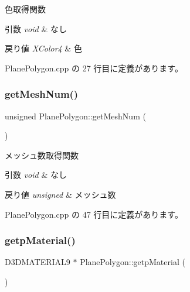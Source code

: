 色取得関数 


\begin{DoxyParams}{引数}
{\em void} & なし \\
\hline
\end{DoxyParams}

\begin{DoxyRetVals}{戻り値}
{\em X\+Color4} & 色 \\
\hline
\end{DoxyRetVals}


 Plane\+Polygon.\+cpp の 27 行目に定義があります。

\mbox{\label{class_plane_polygon_a494068044805bdd4054bc69328c71d7f}} 
\subsubsection{\texorpdfstring{get\+Mesh\+Num()}{getMeshNum()}}
{\footnotesize\ttfamily unsigned Plane\+Polygon\+::get\+Mesh\+Num (\begin{DoxyParamCaption}{ }\end{DoxyParamCaption})}



メッシュ数取得関数 


\begin{DoxyParams}{引数}
{\em void} & なし \\
\hline
\end{DoxyParams}

\begin{DoxyRetVals}{戻り値}
{\em unsigned} & メッシュ数 \\
\hline
\end{DoxyRetVals}


 Plane\+Polygon.\+cpp の 47 行目に定義があります。

\mbox{\label{class_plane_polygon_aa475e66d5cbd2c966d47d97dc253ae24}} 
\subsubsection{\texorpdfstring{getp\+Material()}{getpMaterial()}}
{\footnotesize\ttfamily D3\+D\+M\+A\+T\+E\+R\+I\+A\+L9 $\ast$ Plane\+Polygon\+::getp\+Material (\begin{DoxyParamCaption}{ }\end{DoxyParamCaption})}



